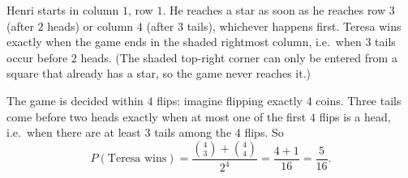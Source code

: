 Henri starts in column $1$, row $1$. He reaches a star as soon as he reaches row $3$ (after $2$ heads) or column $4$ (after $3$ tails), whichever happens first. Teresa wins exactly when the game ends in the shaded rightmost column, i.e.\ when $3$ tails occur before $2$ heads. (The shaded top-right corner can only be entered from a square that already has a star, so the game never reaches it.)

The game is decided within $4$ flips: imagine flipping exactly $4$ coins. Three tails come before two heads exactly when at most one of the first $4$ flips is a head, i.e.\ when there are at least $3$ tails among the $4$ flips. So
\[
P(\text{Teresa wins})=\dfrac{\binom43+\binom44}{2^4}=\dfrac{4+1}{16}=\boxed{\dfrac{5}{16}}.
\]
